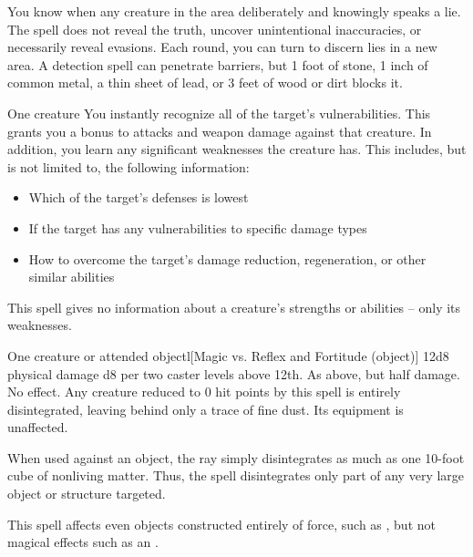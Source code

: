 \spellline
\spelleffect You know when any creature in the area deliberately and knowingly speaks a lie. The spell does not reveal the truth, uncover unintentional inaccuracies, or necessarily reveal evasions.
\spellnotes Each round, you can turn to discern lies in a new area. A detection spell can penetrate barriers, but 1 foot of stone, 1 inch of common metal, a thin sheet of lead, or 3 feet of wood or dirt blocks it.

\spellrng{\rngmed}
\begin{spelltarget}{One creature}
    \spelleffect You instantly recognize all of the target's vulnerabilities. This grants you a  bonus to attacks and weapon damage against that creature. In addition, you learn any significant weaknesses the creature has. This includes, but is not limited to, the following information:
    \begin{itemize}
        \item Which of the target's defenses is lowest
        \item If the target has any vulnerabilities to specific damage types
        \item How to overcome the target's damage reduction, regeneration, or other similar abilities
    \end{itemize}
\end{spelltarget}
\spellnotes This spell gives no information about a creature's strengths or abilities -- only its weaknesses.

\spellrng{\rngclose}
\begin{spelltarget}{One creature or attended object}l[Magic vs. Reflex and Fortitude (object)]
    \spellsuccess 12d8 physical damage \add d8 per two caster levels above 12th.
    \spellfailure[Fortitude] As above, but half damage.
    \spellfailure[Reflex] No effect.
    \spelleffect Any creature reduced to 0 hit points by this spell is entirely disintegrated, leaving behind only a trace of fine dust. Its equipment is unaffected.
    \par When used against an object, the ray simply disintegrates as much as one 10-foot cube of nonliving matter. Thus, the spell disintegrates only part of any very large object or structure targeted.
\end{spelltarget}
\spellnotes This spell affects even objects constructed entirely of force, such as , but not magical effects such as an .

